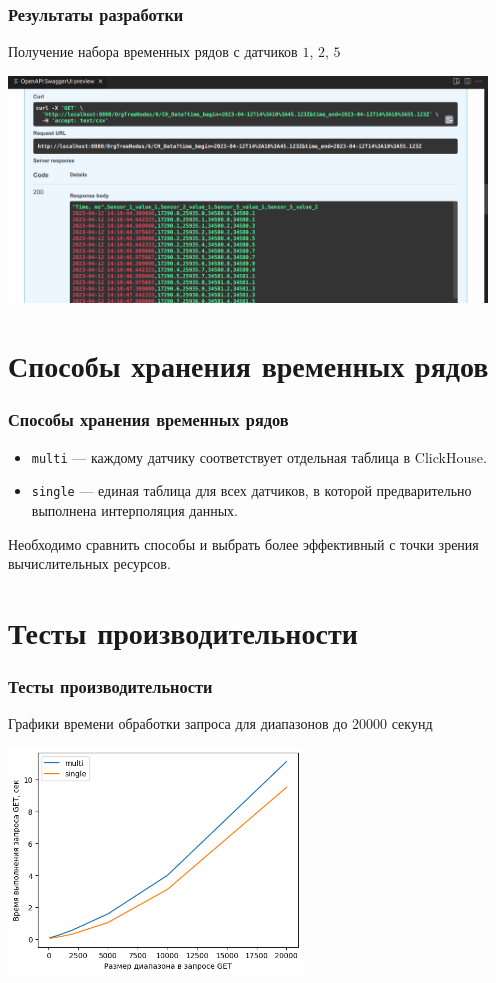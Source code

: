 \documentclass[pdf, hyperref={unicode}, aspectratio=169]{beamer}
\begin{document}
\begin{frame}
	\frametitle{Результаты разработки}
	
	Получение набора временных рядов с датчиков $1$, $2$, $5$
	
	\begin{center}
		\includegraphics[height = 6cm]{swagger8.png}
	\end{center}
\end{frame}


\section{Способы хранения временных рядов}
\begin{frame}
	\frametitle{Способы хранения временных рядов}
	
	\begin{itemize}
		\item \texttt{multi} --- каждому датчику соответствует отдельная таблица в ClickHouse.
		\item \texttt{single} --- единая таблица для всех датчиков, в которой предварительно выполнена интерполяция данных.
	\end{itemize}
	
	Необходимо сравнить способы и выбрать более эффективный с точки зрения вычислительных ресурсов.
\end{frame}


\section{Тесты производительности}
\begin{frame}
	\frametitle{Тесты производительности}
	
	Графики времени обработки запроса для диапазонов до $20000$ секунд
	
	\begin{center}
		\includegraphics[height = 6cm]{bench2e4.png}
	\end{center}
\end{frame}
\end{document}

